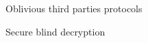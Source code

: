 \begin{frame}{Oblivious third parties protocols~\cite{DBLP:conf/dim/CamenischGH08}}

\end{frame}

\begin{frame}{Secure blind decryption~\cite{DBLP:conf/pkc/Green11}}

\end{frame}

% 
%  
%        
%        
% 
%        
%        
% 
%  
%  
% 
% 
% 
% 
% 
% 
